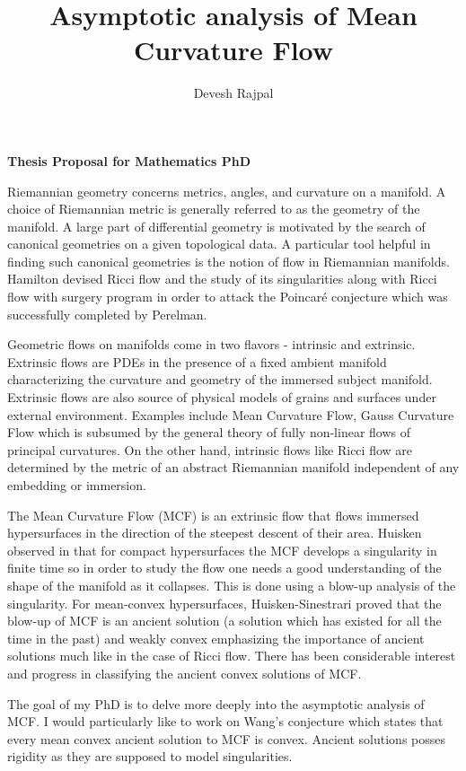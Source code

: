 \documentclass[12pt]{article}
\title{Asymptotic analysis of Mean Curvature Flow}
\author{Devesh Rajpal}
\date{}
\begin{document}
\maketitle
\begin{center}
   \textbf{Thesis Proposal for Mathematics PhD} 
\end{center}


Riemannian geometry concerns metrics, angles, and curvature on a manifold. A choice of Riemannian metric is generally referred to as the geometry of the manifold. A large part of differential geometry is motivated by the search of canonical geometries on a given topological data. A particular tool helpful in finding such canonical geometries is the notion of flow in Riemannian manifolds. %
Hamilton devised Ricci flow and the study of its singularities along with Ricci flow with surgery program in order to attack the Poincar\'{e} conjecture %
which was successfully completed by Perelman. 

Geometric flows on manifolds come in two flavors - intrinsic and extrinsic. Extrinsic flows are PDEs in the presence of a fixed ambient manifold characterizing the curvature and geometry of the immersed subject manifold. Extrinsic flows are also source of physical models of grains and surfaces under external environment. Examples include Mean Curvature Flow, Gauss Curvature Flow which is subsumed by the general theory of fully non-linear flows of principal curvatures. On the other hand, intrinsic flows like Ricci flow are determined by the metric of an abstract Riemannian manifold independent of any embedding or immersion. 

The Mean Curvature Flow (MCF) is an extrinsic flow that flows immersed hypersurfaces  %
in the direction of the steepest descent of their area. Huisken observed in \cite{huisken1984flow} that for compact hypersurfaces the MCF develops a singularity in finite time so in order to study the flow one needs a good understanding of the shape of the manifold as it collapses. This is done using a blow-up analysis of the singularity. For mean-convex hypersurfaces, Huisken-Sinestrari proved that the blow-up of MCF is an ancient solution (a solution which has existed for all the time in the past) and weakly convex emphasizing the importance of ancient solutions much like in the case of Ricci flow. There has been considerable interest and progress in classifying the ancient convex solutions of MCF. 

The goal of my PhD is to delve more deeply into the asymptotic analysis of MCF. I would particularly like to work on Wang's conjecture which states that every mean convex ancient solution to MCF is convex.  %
Ancient solutions posses rigidity as they are supposed to model singularities.

\newpage

\nocite{*}
\end{document}
